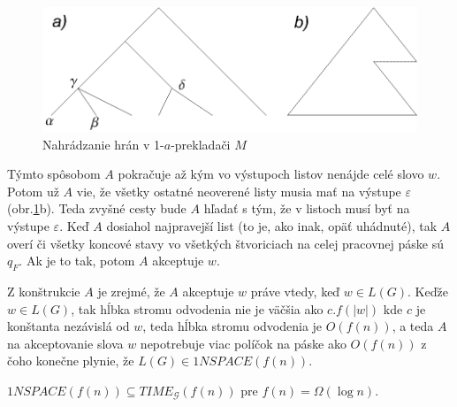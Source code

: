 \begin{dokaz}
\begin{figure}[!ht]
\centering
\includegraphics{./OBRAZKY/GSYSTEMS/NSTROM}
\caption{Nahrádzanie hrán v 1-$a$-prekladači $M$} \label{gs_obr_nstrom}
\end{figure}

Týmto spôsobom $A$ pokračuje až kým vo výstupoch listov nenájde
celé slovo $w$. Potom už $A$ vie, že všetky ostatné neoverené
listy musia mať na výstupe $\varepsilon$ (obr.\ref{gs_obr_nstrom}b). Teda
zvyšné cesty bude $A$ hľadať s tým, že v listoch musí byť na
výstupe $\varepsilon$. Keď $A$ dosiahol najpravejší list (to je,
ako inak, opäť uhádnuté), tak $A$ overí či všetky koncové stavy vo
všetkých štvoriciach na celej pracovnej páske sú $q_F$. Ak je to
tak, potom $A$ akceptuje $w$.

Z konštrukcie $A$ je zrejmé, že $A$ akceptuje $w$ práve vtedy, keď
$w\in L(G)$. Keďže $w\in L(G)$, tak hĺbka stromu odvodenia nie je
väčšia ako $c.f(|w|)$ kde $c$ je konštanta nezávislá od $w$, teda
hĺbka stromu odvodenia je $O(f(n))$, a teda $A$ na akceptovanie
slova $w$ nepotrebuje viac políčok na páske ako $O(f(n))$ z čoho
konečne plynie, že $L(G)\in 1NSPACE(f(n))$.
\end{dokaz}

\begin{lema}
$1NSPACE(f(n))\subseteq TIME_{\mathcal{G}}(f(n))$ pre $f(n)=\Omega
(\log n)$.
\end{lema}

